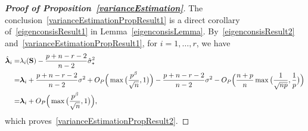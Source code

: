 \documentclass[review]{elsarticle}
\newcommand{\bfsym}[1]{\ensuremath{\boldsymbol{#1}}}
\def\blambda {\bfsym {\lambda}}        \def\bLambda {\bfsym {\Lambda}}
\theoremstyle{plain}
\theoremstyle{definition}
\theoremstyle{remark}
\begin{document}
\begin{appendices}
\begin{proof}[\textbf{Proof of Proposition~\ref{varianceEstimation}}]
    The conclusion~\eqref{varianceEstimationPropResult1} is a direct corollary of~\eqref{eigenconsisResult1} in Lemma~\ref{eigenconsisLemma}.
    By~\eqref{eigenconsisResult2} and~\eqref{varianceEstimationPropResult1}, for $i=1,\ldots, r$, we have 
    $$
    \begin{aligned}
        \hat{\blambda}_i=&
        \lambda_i(\BS)-\frac{p+n-r-2}{n-2}\hat{\sigma}_*^2\\
        =& \blambda_i +\frac{p+n-r-2}{n-2}\sigma^2+O_P\Big(\max\big(\frac{p^{\beta}}{\sqrt{n}},1\big)\Big)
        -\frac{p+n-r-2}{n-2}\sigma^2-O_P\Big( \frac{n+p}{n}\max\big(\frac{1}{\sqrt{np}},\frac{1}{p}\big)\Big)\\
        =& \blambda_i+O_P\Big(\max\big(\frac{p^{\beta}}{\sqrt{n}},1\big)\Big),
    \end{aligned}
    $$
    which proves~\eqref{varianceEstimationPropResult2}.
\end{proof}




\end{appendices}
\end{document}
